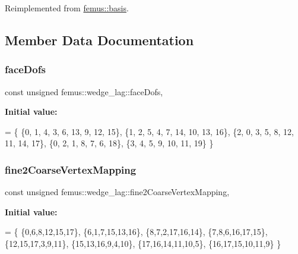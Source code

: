 Reimplemented from \mbox{\hyperlink{classfemus_1_1basis_abbb9deb1bd0b2d07a4b2995b07d58d2e}{femus\+::basis}}.



\subsection{Member Data Documentation}
\mbox{\label{classfemus_1_1wedge__lag_a6a6ecd3a809022a3e1e35a2081741c23}} 
\subsubsection{\texorpdfstring{face\+Dofs}{faceDofs}}
{\footnotesize\ttfamily const unsigned femus\+::wedge\+\_\+lag\+::face\+Dofs\hspace{0.3cm}{\ttfamily [static]}, {\ttfamily [protected]}}

{\bfseries Initial value\+:}
\begin{DoxyCode}
= \{ 
      \{0, 1, 4, 3, 6, 13, 9, 12, 15\},
      \{1, 2, 5, 4, 7, 14, 10, 13, 16\},
      \{2, 0, 3, 5, 8, 12, 11, 14, 17\},
      \{0, 2, 1, 8, 7, 6, 18\},
      \{3, 4, 5, 9, 10, 11, 19\}
  \}
\end{DoxyCode}
\mbox{\label{classfemus_1_1wedge__lag_a68a51b290864af934edbc7e66fe360e1}} 
\subsubsection{\texorpdfstring{fine2\+Coarse\+Vertex\+Mapping}{fine2CoarseVertexMapping}}
{\footnotesize\ttfamily const unsigned femus\+::wedge\+\_\+lag\+::fine2\+Coarse\+Vertex\+Mapping\hspace{0.3cm}{\ttfamily [static]}, {\ttfamily [protected]}}

{\bfseries Initial value\+:}
\begin{DoxyCode}
= \{ 
    \{0,6,8,12,15,17\},
    \{6,1,7,15,13,16\},
    \{8,7,2,17,16,14\},
    \{7,8,6,16,17,15\},
    \{12,15,17,3,9,11\},
    \{15,13,16,9,4,10\},
    \{17,16,14,11,10,5\},
    \{16,17,15,10,11,9\}
  \}
\end{DoxyCode}
\mbox{\label{classfemus_1_1wedge__lag_a359875eed68f83c48e236d981f415eab}} 
